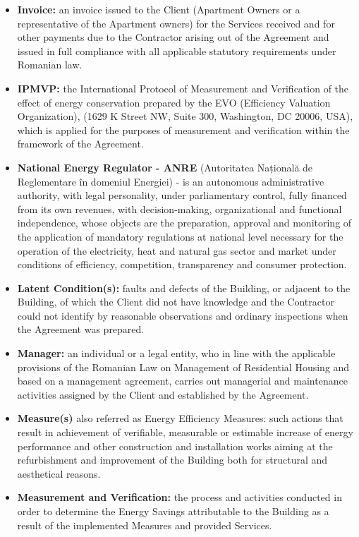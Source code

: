 \begin{multicols}{2}
\begin{itemize}[label={}]
	\item\textbf{Invoice:} an invoice issued to the Client (Apartment Owners or a representative of the Apartment owners) for the Services received and for other payments due to the Contractor arising out of the Agreement and issued in full compliance with all applicable statutory requirements under Romanian law.
	\item\textbf{IPMVP:} the International Protocol of Measurement and Verification of the effect of energy conservation prepared by the EVO (Efficiency Valuation Organization), (1629 K Street NW, Suite 300, Washington, DC 20006, USA), which is applied for the purposes of measurement and verification within the framework of the Agreement.
        \item\textbf{National Energy Regulator - ANRE} (Autoritatea Națională de Reglementare în domeniul Energiei) - is an autonomous administrative authority, with legal personality, under parliamentary control, fully financed from its own revenues, with decision-making, organizational and functional independence, whose objects are the preparation, approval and monitoring of the application of mandatory regulations at national level necessary for the operation of the electricity, heat and natural gas sector and market under conditions of efficiency, competition, transparency and consumer protection.
	\item\textbf{Latent Condition(s):} faults and defects of the Building, or adjacent to the Building, of which the Client did not have knowledge and the Contractor could not identify by reasonable observations and ordinary inspections when the Agreement was prepared.
	\item\textbf{Manager:} an individual or a legal entity, who in line with the applicable provisions of the Romanian Law on Management of Residential Housing and based on a management agreement, carries out managerial and maintenance activities assigned by the Client and established by the Agreement.
	\item\textbf{Measure(s)} also referred as Energy Efficiency Measures: such actions that result in achievement of verifiable, measurable or estimable increase of energy performance and other construction and installation works aiming at the refurbishment and improvement of the Building both for structural and aesthetical reasons.
	\item\textbf{Measurement and Verification:} the process and activities conducted in order to determine the Energy Savings attributable to the Building as a result of the implemented Measures and provided Services.

\end{itemize}
\end{multicols}
